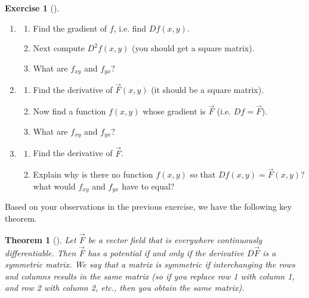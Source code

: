 \documentclass[10pt,]{book}
\theoremstyle{plain}
\newtheorem{theorem}{Theorem}[section]
\theoremstyle{definition}
\theoremstyle{definition}
\theoremstyle{definition}
\theoremstyle{definition}
\newtheorem{exploration}[project]{Exercise}
\theoremstyle{definition}
\numberwithin{equation}{section}
\begin{document}
\begin{exploration}[]\label{exploration-204}
\leavevmode%
\begin{enumerate}[font=\bfseries,label=(\alph*),ref=\alph*]
\item\label{task-513} \begin{enumerate}[font=\bfseries,label=(\roman*),ref=\theenumi.\roman*]
\item\label{task-514} Find the gradient of \(f\), i.e. find \(Df(x,y)\).%
\item\label{task-515} Next compute \(D^2f(x,y)\) (you should get a square matrix).%
\item\label{task-516} What are \(f_{xy}\) and \(f_{yx}\)?%
\end{enumerate}
\item\label{task-517} \begin{enumerate}[font=\bfseries,label=(\roman*),ref=\theenumi.\roman*]
\item\label{task-518} Find the derivative of \(\vec F(x,y)\) (it should be a square matrix).%
\item\label{task-519} Now find a function \(f(x,y)\) whose gradient is \(\vec F\) (i.e. \(Df=\vec F\)).%
\item\label{task-520} What are \(f_{xy}\) and \(f_{yx}\)?%
\end{enumerate}
\item\label{task-521} \begin{enumerate}[font=\bfseries,label=(\roman*),ref=\theenumi.\roman*]
\item\label{task-522} Find the derivative of \(\vec F\).%
\item\label{task-523} Explain why is there no function \(f(x,y)\) so that \(Df(x,y)=\vec F(x,y)\)? what would \(f_{xy}\) and \(f_{yx}\) have to equal?%
%
\end{enumerate}
\end{enumerate}
\end{exploration}
Based on your observations in the previous exercise, we have the following key theorem.%
\begin{theorem}[{}]\label{thm_has_potential}
Let \(\vec F\) be a vector field that is everywhere continuously differentiable. Then \(\vec F\) has a potential if and only if the derivative \(D\vec F\) is a symmetric matrix. We say that a matrix is symmetric if interchanging the rows and columns results in the same matrix (so if you replace row 1 with column 1, and row 2 with column 2, etc., then you obtain the same matrix).%
\end{theorem}
\end{document}
